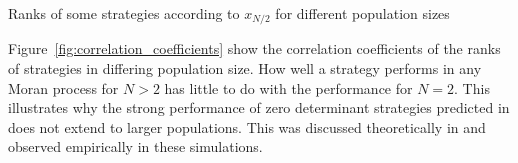 \documentclass{article}
\begin{document}
\begin{table}[!hbtp]
    \centering
    \scriptsize
    
    \caption{Ranks of some strategies according to \(x_{N/2}\) for different
    population sizes}
    \label{tbl:ranks_v_size_coexist}
\end{table}


Figure~\ref{fig:correlation_coefficients} show the correlation coefficients
of the ranks of strategies in differing population size. How well a strategy
performs in any Moran process for \(N>2\) has
little to do with the performance for \(N=2\). This illustrates why the strong
performance of zero determinant strategies predicted in \cite{Press2012} does
not extend to larger populations. This was discussed theoretically in
\cite{Adami2013} and observed empirically in these simulations.
\end{document}

